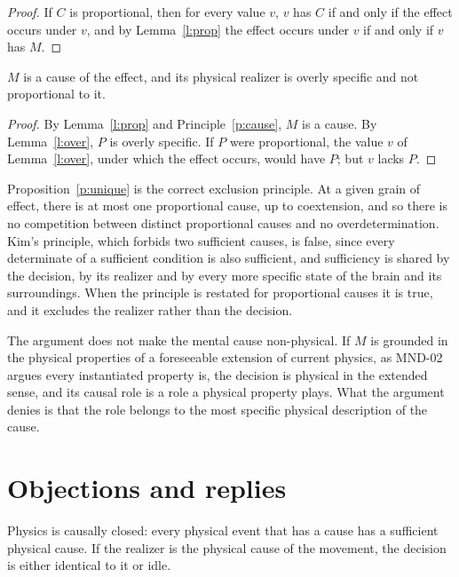 \documentclass{situationist-preprint}
\begin{document}
\begin{proof}
If $C$ is proportional, then for every value $v$, $v$ has $C$ if and only if the effect occurs under $v$, and by Lemma~\ref{l:prop} the effect occurs under $v$ if and only if $v$ has $M$.
\end{proof}

\begin{theorem}\label{t:main}
$M$ is a cause of the effect, and its physical realizer is overly specific and not proportional to it.
\end{theorem}

\begin{proof}
By Lemma~\ref{l:prop} and Principle~\ref{p:cause}, $M$ is a cause. By Lemma~\ref{l:over}, $P$ is overly specific. If $P$ were proportional, the value $v$ of Lemma~\ref{l:over}, under which the effect occurs, would have $P$; but $v$ lacks $P$.
\end{proof}

Proposition~\ref{p:unique} is the correct exclusion principle. At a given grain of effect, there is at most one proportional cause, up to coextension, and so there is no competition between distinct proportional causes and no overdetermination. Kim's principle, which forbids two sufficient causes, is false, since every determinate of a sufficient condition is also sufficient, and sufficiency is shared by the decision, by its realizer and by every more specific state of the brain and its surroundings. When the principle is restated for proportional causes it is true, and it excludes the realizer rather than the decision.

The argument does not make the mental cause non-physical. If $M$ is grounded in the physical properties of a foreseeable extension of current physics, as MND-02 argues every instantiated property is, the decision is physical in the extended sense, and its causal role is a role a physical property plays. What the argument denies is that the role belongs to the most specific physical description of the cause.

\section{Objections and replies}

\begin{objection}[Closure]
Physics is causally closed: every physical event that has a cause has a sufficient physical cause. If the realizer is the physical cause of the movement, the decision is either identical to it or idle.
\end{objection}
\end{document}
